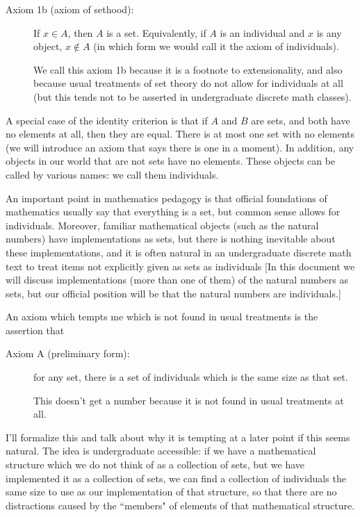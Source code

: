 \documentclass[12pt]{article}
\begin{document}
\begin{description}
\begin{description}
\item[Axiom 1b (axiom of sethood):]  If $x \in A$, then $A$ is a set.  Equivalently, if $A$ is an individual and $x$ is any object, $x \not\in A$ (in which form we would call it the axiom of individuals).

We call this axiom 1b because it is a footnote to extensionality, and also because usual treatments of set theory do not allow for individuals at all (but this tends not to be asserted in undergraduate discrete math classes).
\end{description}

A special case of the identity criterion is that if $A$ and $B$ are sets, and both have no elements at all, then they are equal.   There is at most one set with no elements (we will introduce an axiom that says there is one in a moment).  In addition, any objects in our world that are not sets have no elements.  These objects can be called by various names:  we call them individuals.

An important point in mathematics pedagogy is that official foundations of mathematics usually say that everything is a set,  but common sense allows for individuals.  Moreover, familiar mathematical objects (such as the natural numbers) have implementations as sets, but there is nothing inevitable about these implementations, and it is often natural in an undergraduate discrete math text to treat items not explicitly given as sets as individuals [In this document we will discuss implementations (more than one of them) of the natural numbers as sets, but our official position will be that the natural numbers are individuals.]

An axiom which tempts me which is not found in usual treatments is the assertion that 

\begin{description}

\item[Axiom A (preliminary form):]  for any set, there is a set of individuals which is the same size as that set.  

This doesn't get a number because it is not found in usual treatments at all.

\end{description}

I'll formalize this and talk about why it is tempting at a later point if this seems natural.  The idea is undergraduate accessible:  if we have a mathematical structure which we do not think of as a collection of sets, but we have implemented it as a collection of sets, we can find a collection of individuals the same size to use as our implementation of that structure, so that there are no distractions caused by the ``members" of elements of that mathematical structure.


\end{description}
\end{document}
